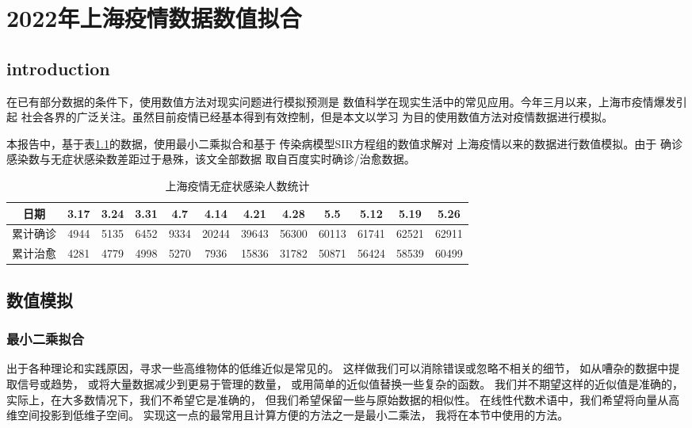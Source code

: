 \documentclass[a4paper]{book}
\numberwithin{equation}{chapter}
\theoremstyle{definition}
\begin{document}

\pagestyle{fancy}


\setcounter{chapter}{0}



\chapter{2022年上海疫情数据数值拟合}

\setcounter{page}{1}
\section{introduction}
在已有部分数据的条件下，使用数值方法对现实问题进行模拟预测是
数值科学在现实生活中的常见应用。今年三月以来，上海市疫情爆发引起
社会各界的广泛关注。虽然目前疫情已经基本得到有效控制，但是本文以学习
为目的使用数值方法对疫情数据进行模拟。

本报告中，基于表\ref{fig:numbers}的数据，使用最小二乘拟合和基于
传染病模型SIR方程组的数值求解对
上海疫情以来的数据进行数值模拟。由于
确诊感染数与无症状感染数差距过于悬殊，该文全部数据
取自百度实时确诊/治愈数据。
\begin{table}[H]
  \centering
  \begin{tabular}[H]{|c|c|c|c|c|c|c|c|c|c|c|c|}
    \hline
    日期      & 3.17 & 3.24 & 3.31 & 4.7 & 4.14   & 4.21  & 4.28 & 5.5 & 5.12 & 5.19 & 5.26  \\
    \hline
    累计确诊 & 4944 & 5135 & 6452 & 9334 & 20244 & 39643 & 56300 & 60113 & 61741 & 62521 & 62911  \\
    \hline
    累计治愈 & 4281 & 4779 & 4998 & 5270 & 7936 & 15836 & 31782 & 50871 & 56424 & 58539 & 60499  \\
    \hline
  \end{tabular}
  \caption{上海疫情无症状感染人数统计}
  \label{fig:numbers}
\end{table}

\section{数值模拟}
\subsection{最小二乘拟合}
出于各种理论和实践原因，寻求一些高维物体的低维近似是常见的。
这样做我们可以消除错误或忽略不相关的细节，
如从嘈杂的数据中提取信号或趋势，
或将大量数据减少到更易于管理的数量，
或用简单的近似值替换一些复杂的函数。
我们并不期望这样的近似值是准确的，
实际上，在大多数情况下，我们不希望它是准确的，
但我们希望保留一些与原始数据的相似性。
在线性代数术语中，我们希望将向量从高维空间投影到低维子空间。
实现这一点的最常用且计算方便的方法之一是最小二乘法，
我将在本节中使用的方法。
\end{document}
